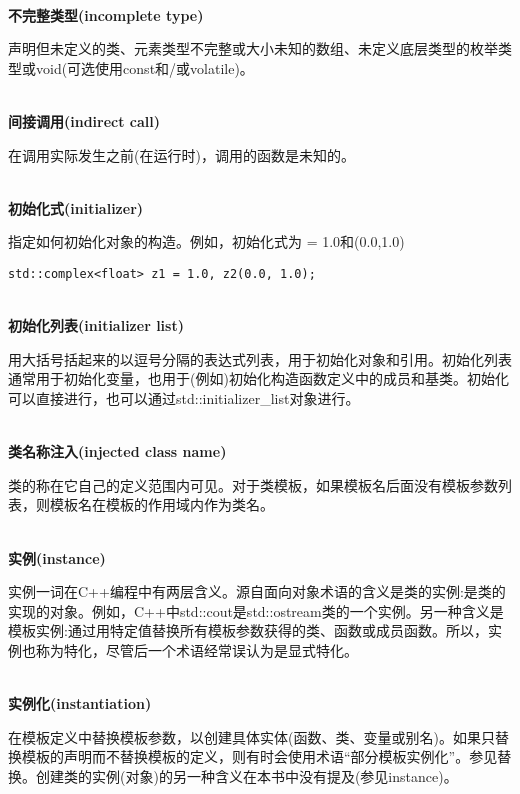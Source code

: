 \hspace*{\fill} \\ %
\noindent
\textbf{不完整类型(incomplete type)}

声明但未定义的类、元素类型不完整或大小未知的数组、未定义底层类型的枚举类型或void(可选使用const和/或volatile)。

\hspace*{\fill} \\ %
\noindent
\textbf{间接调用(indirect call)}

在调用实际发生之前(在运行时)，调用的函数是未知的。

\hspace*{\fill} \\ %
\noindent
\textbf{初始化式(initializer)}

指定如何初始化对象的构造。例如，初始化式为 = 1.0和(0.0,1.0)
\begin{lstlisting}[style=styleCXX]
std::complex<float> z1 = 1.0, z2(0.0, 1.0);
\end{lstlisting}

\hspace*{\fill} \\ %
\noindent
\textbf{初始化列表(initializer list)}

用大括号括起来的以逗号分隔的表达式列表，用于初始化对象和引用。初始化列表通常用于初始化变量，也用于(例如)初始化构造函数定义中的成员和基类。初始化可以直接进行，也可以通过std::initializer\_list对象进行。

\hspace*{\fill} \\ %
\noindent
\textbf{类名称注入(injected class name)}

类的称在它自己的定义范围内可见。对于类模板，如果模板名后面没有模板参数列表，则模板名在模板的作用域内作为类名。

\hspace*{\fill} \\ %
\noindent
\textbf{实例(instance)}

实例一词在C++编程中有两层含义。源自面向对象术语的含义是类的实例:是类的实现的对象。例如，C++中std::cout是std::ostream类的一个实例。另一种含义是模板实例:通过用特定值替换所有模板参数获得的类、函数或成员函数。所以，实例也称为特化，尽管后一个术语经常误认为是显式特化。

\hspace*{\fill} \\ %
\noindent
\textbf{实例化(instantiation)}

在模板定义中替换模板参数，以创建具体实体(函数、类、变量或别名)。如果只替换模板的声明而不替换模板的定义，则有时会使用术语“部分模板实例化”。参见替换。创建类的实例(对象)的另一种含义在本书中没有提及(参见instance)。

